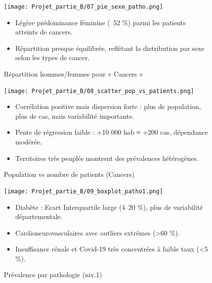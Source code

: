 \documentclass[12pt,a4paper]{article}
\begin{document}
\begin{figure}[H]
  \centering
  \begin{minipage}[t]{1\textwidth}
    \centering
    \texttt{[image: Projet\_partie\_B/07\_pie\_sexe\_patho.png]}
    \caption{Répartition hommes/femmes pour « Cancers »}
    \label{fig:pie_sexe}
  \end{minipage}
    \begin{itemize}
      \item Légère prédominance féminine (~52 \%) parmi les patients atteints de cancers.  
      \item Répartition presque équilibrée, reflétant la distribution par sexe selon les types de cancer.  
    \end{itemize}
\end{figure}

\begin{figure}[H]
  \centering
  \begin{minipage}[t]{1.2\textwidth}
    \centering
    \texttt{[image: Projet\_partie\_B/08\_scatter\_pop\_vs\_patients.png]}
    \caption{Population vs nombre de patients (Cancers)}
    \label{fig:scatter_pop_patients}
  \end{minipage}
    \begin{itemize}
      \item Corrélation positive mais dispersion forte : plus de population, plus de cas, mais variabilité importante. 
      \item Pente de régression faible : +10 000 hab ≈ +200 cas, dépendance modérée.  
      \item Territoires très peuplés montrent des prévalences hétérogènes.  
    \end{itemize}

\end{figure}

\begin{figure}[H]
  \centering
  \begin{minipage}[t]{0.8\textwidth}
    \centering
    \texttt{[image: Projet\_partie\_B/09\_boxplot\_patho1.png]}
    \caption{Prévalence par pathologie (niv.1)}
    \label{fig:boxplot_patho1}
  \end{minipage}
    \begin{itemize}
      \item Diabète : Ecart Interquartile large (4–20 \%), plus de variabilité départementale.  
      \item Cardioneurovasculaires avec outliers extrêmes (>60 \%).
      \item Insuffisance rénale et Covid-19 très concentrées à faible taux (<5 \%).  
    \end{itemize}
\end{figure}
\end{document}

